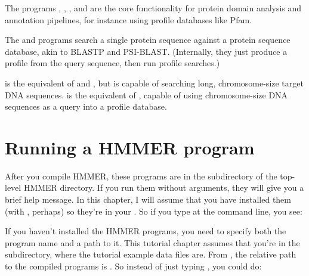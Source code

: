 The programs , , , and
 are the core functionality for protein domain analysis
and annotation pipelines, for instance using profile databases like
Pfam.

The  and  programs search a single
protein sequence against a protein sequence database, akin to BLASTP
and PSI-BLAST.  (Internally, they just produce a profile from the
query sequence, then run profile searches.)

 is the equivalent of  and ,
but is capable of searching long, chromosome-size target DNA
sequences.   is the equivalent of ,
capable of using chromosome-size DNA sequences as a query into a
profile database.




\section{Running a HMMER program}
\label{section:running}

After you compile HMMER, these programs are in the 
subdirectory of the top-level HMMER directory. If you run them without
arguments, they will give you a brief help message.  In this
chapter, I will assume that you have installed them (with , perhaps) so they're in your . So if you type
 at the command line, you see:

  \vspace{1ex}
  \vspace{-1ex}
  \vspace{-1ex}

If you haven't installed the HMMER programs, you need to specify both
the program name and a path to it. This tutorial chapter assumes
that you're in the  subdirectory, where the tutorial
example data files are. From  , the relative
path to the compiled programs is . So instead of just
typing , you could do: 


